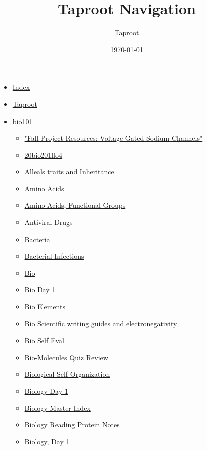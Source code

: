 \documentclass[11pt]{article}
\author{Taproot}
\date{\today}
\title{Taproot Navigation}
\begin{document}
\maketitle
\tableofcontents

\begin{itemize}
\item \href{theindex.org}{Index}
\item \href{index.org}{Taproot}
\item bio101
\begin{itemize}
\item \href{bio101/KBe20bio201retFallProjectExport.org}{"Fall Project Resources: Voltage Gated Sodium Channels"}
\item \href{bio101/20bio201flo4.org}{20bio201flo4}
\item \href{bio101/KBhBIO101Inheritance.org}{Alleals traits and Inheritance}
\item \href{bio101/KBe20bio101refAminoAcids.org}{Amino Acids}
\item \href{bio101/KBhBIO101AminoAcids.org}{Amino Acids, Functional Groups}
\item \href{bio101/KBhBIO101AntiViralDrugs.org}{Antiviral Drugs}
\item \href{bio101/KBe20bio101refBactera.org}{Bacteria}
\item \href{bio101/KBhBIO101BacterialInfections.org}{Bacterial Infections}
\item \href{bio101/KB20200825142200.org}{Bio}
\item \href{bio101/KBe2020bio101retFreeAssociation.org}{Bio Day 1}
\item \href{bio101/KBe2020bio101refElements.org}{Bio Elements}
\item \href{bio101/KB20200831091126.org}{Bio Scientific writing guides and electronegativity}
\item \href{bio101/KBxBioSelfEval2020.org}{Bio Self Eval}
\item \href{bio101/KBhBIO101BioMoleculesQuizReview.org}{Bio-Molecules Quiz Review}
\item \href{bio101/KBhBIO101SelfOrganization.org}{Biological Self-Organization}
\item \href{bio101/KBhBIO101Day1.org}{Biology Day 1}
\item \href{bio101/KBBiologyMasterIndex.org}{Biology Master Index}
\item \href{bio101/KBBIO101ProteinReading.org}{Biology Reading Protein Notes}
\item \href{bio101/KBhBIO101LetsDoBio.org}{Biology, Day 1}

\end{itemize}
\end{itemize}
\end{document}
